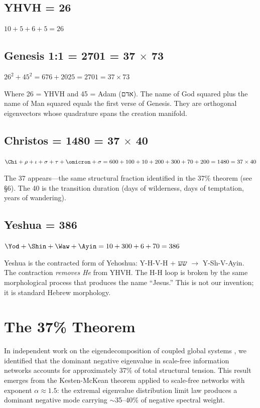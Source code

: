 \documentclass[12pt]{article}
\begin{document}
\subsection{YHVH = 26}

$10 + 5 + 6 + 5 = 26$

\subsection{Genesis 1:1 = 2701 = 37 $\times$ 73}

$26^2 + 45^2 = 676 + 2025 = 2701 = 37 \times 73$

Where 26 = YHVH and 45 = Adam (אדם). The name of God squared plus the name of Man squared equals the first verse of Genesis. They are orthogonal eigenvectors whose quadrature spans the creation manifold.

\subsection{Christos = 1480 = 37 $\times$ 40}

$\Chi + \rho + \iota + \sigma + \tau + \omicron + \sigma = 600 + 100 + 10 + 200 + 300 + 70 + 200 = 1480 = 37 \times 40$

The 37 appears---the same structural fraction identified in the 37\% theorem (see \S6). The 40 is the transition duration (days of wilderness, days of temptation, years of wandering).

\subsection{Yeshua = 386}

$\Yod + \Shin + \Waw + \Ayin = 10 + 300 + 6 + 70 = 386$

Yeshua is the contracted form of Yehoshua: Y-H-V-H + שע $\to$ Y-Sh-V-Ayin. The contraction \textit{removes He} from YHVH. The H-H loop is broken by the same morphological process that produces the name ``Jesus.'' This is not our invention; it is standard Hebrew morphology.

\section{The 37\% Theorem}

In independent work on the eigendecomposition of coupled global systems \cite{crawford2026world}, we identified that the dominant negative eigenvalue in scale-free information networks accounts for approximately 37\% of total structural tension. This result emerges from the Kesten-McKean theorem applied to scale-free networks with exponent $\alpha \approx 1.5$: the extremal eigenvalue distribution limit law produces a dominant negative mode carrying $\sim$35--40\% of negative spectral weight.
\end{document}
